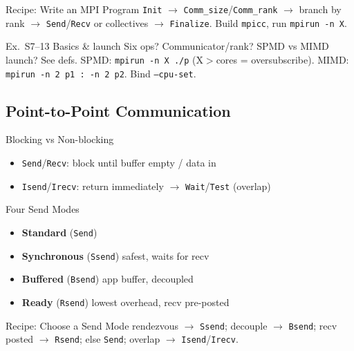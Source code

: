 \begin{KR}{Recipe: Write an MPI Program}
    \texttt{Init} $\to$ \texttt{Comm\_size}/\texttt{Comm\_rank} $\to$ branch by rank $\to$ \texttt{Send}/\texttt{Recv} or collectives $\to$ \texttt{Finalize}. Build \texttt{mpicc}, run \texttt{mpirun -n X}.
\end{KR}

\begin{example2}{Ex.\ S7--13 Basics \& launch}
    Six ops? Communicator/rank? SPMD vs MIMD launch?
    \tcblower
    See defs. SPMD: \texttt{mpirun -n X ./p} (X$>$cores = oversubscribe). MIMD: \texttt{mpirun -n 2 p1 : -n 2 p2}. Bind \texttt{--cpu-set}.
\end{example2}

\subsection{Point-to-Point Communication}

\begin{concept}{Blocking vs Non-blocking}
    \begin{itemize}
        \item \texttt{Send}/\texttt{Recv}: block until buffer empty / data in
        \item \texttt{Isend}/\texttt{Irecv}: return immediately $\to$ \texttt{Wait}/\texttt{Test} (overlap)
    \end{itemize}
\end{concept}

\begin{definition}{Four Send Modes}
    \begin{itemize}
        \item \textbf{Standard} (\texttt{Send})
        \item \textbf{Synchronous} (\texttt{Ssend}) safest, waits for recv
        \item \textbf{Buffered} (\texttt{Bsend}) app buffer, decoupled
        \item \textbf{Ready} (\texttt{Rsend}) lowest overhead, recv pre-posted
    \end{itemize}
\end{definition}

\begin{KR}{Recipe: Choose a Send Mode}
    rendezvous $\to$ \texttt{Ssend}; decouple $\to$ \texttt{Bsend}; recv posted $\to$ \texttt{Rsend}; else \texttt{Send}; overlap $\to$ \texttt{Isend}/\texttt{Irecv}.
\end{KR}

